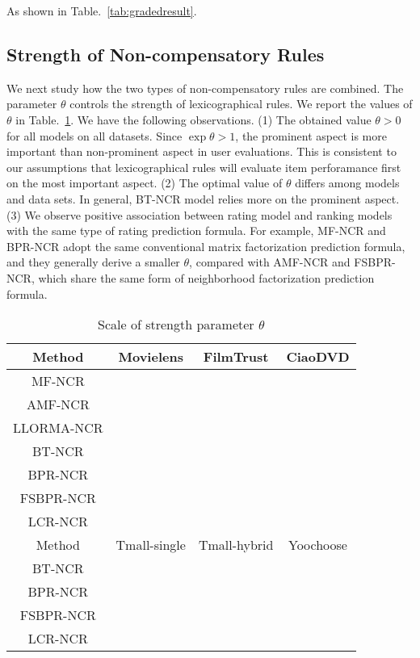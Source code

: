 \documentclass[letterpaper]{article} %
\begin{document}
As shown in Table.~\ref{tab:gradedresult}. 


\subsection{Strength of Non-compensatory Rules}

We next study how the two types of non-compensatory rules are combined. The parameter $\theta$ controls the strength of lexicographical rules. We report the values of $\theta$ in Table.~\ref{tab:theta}. We have the following observations. (1) The obtained value $\theta>0$ for all models on all datasets. Since $\exp\theta>1$, the prominent aspect is more important than non-prominent aspect in user evaluations. This is consistent to our assumptions that lexicographical rules will evaluate item perforamance first on the most important aspect. (2) The optimal value of $\theta$ differs among models and data sets. In general, BT-NCR model relies more on the prominent aspect. (3) We observe positive association between rating model and ranking models with the same type of rating prediction formula. For example, MF-NCR and BPR-NCR adopt the same conventional matrix factorization prediction formula, and they generally derive a smaller $\theta$, compared with AMF-NCR and FSBPR-NCR, which share the same form of neighborhood factorization prediction formula.  

 

\begin{table}[htp]
\tiny
\caption{Scale of strength parameter $\theta$}
\begin{center}
\begin{tabular}{|c|c|c|c|}
\hline
Method & Movielens & FilmTrust & CiaoDVD \\\hline
MF-NCR & & & \\\hline
AMF-NCR & & & \\\hline
LLORMA-NCR & & & \\\hline
BT-NCR & & & \\\hline
BPR-NCR & & & \\\hline
FSBPR-NCR & & & \\\hline
LCR-NCR & & & \\\hline
Method & Tmall-single & Tmall-hybrid & Yoochoose \\\hline
BT-NCR & & & \\\hline
BPR-NCR & & & \\\hline
FSBPR-NCR & & & \\\hline
LCR-NCR & & & \\\hline
\end{tabular}
\end{center}
\label{tab:theta}
\end{table}%
\end{document}
